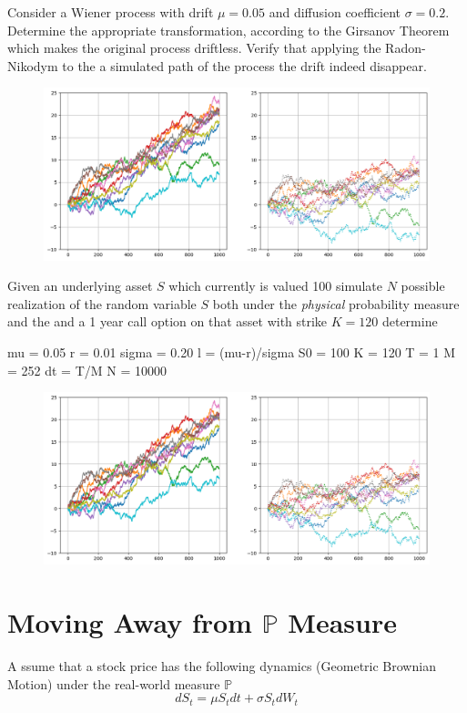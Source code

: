 \documentclass[12pt,a4paper]{article}
\begin{document}
\begin{question}
Consider a Wiener process with drift $\mu=0.05$ and diffusion coefficient $\sigma=0.2$. Determine the appropriate transformation, according to the Girsanov Theorem which makes the original process driftless. Verify that applying the Radon-Nikodym to the a simulated path of the process the drift indeed disappear.

\begin{figure}[htbp]
	\begin{center}
		\includegraphics[width=0.5\linewidth]{addons/brownian_motion_girsanov}
	\end{center}
	\label{fig:brownian_motion_girsanov}
\end{figure}
\end{question}

\begin{question}
Given an underlying asset $S$ which currently is valued 100 simulate $N$ possible realization of the random variable $S$ both under the \emph{physical} probability measure and the 
and a 1 year call option on that asset with strike $K=120$ determine 


mu = 0.05
r = 0.01
sigma = 0.20
l = (mu-r)/sigma
S0 = 100
K = 120
T = 1
M = 252
dt = T/M
N = 10000
\begin{figure}[htbp]
	\begin{center}
		\includegraphics[width=0.5\linewidth]{addons/brownian_motion_girsanov}
	\end{center}
	\label{fig:brownian_motion_girsanov}
\end{figure}
\end{question}
\clearpage

\section{Moving Away from $\mathbb{P}$ Measure}
A
ssume that a stock price has the following dynamics (Geometric Brownian Motion) under the real-world measure $\mathbb{P}$
\begin{equation*}
dS_t = \mu S_t dt + \sigma S_t dW_t
\end{equation*}
\end{document}
